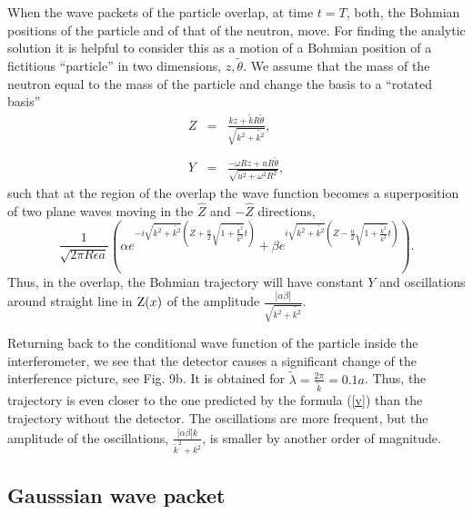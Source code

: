 \documentclass[12pt,preprint,tightenlines]{elsarticle}
\begin{document}
When the wave packets of the particle overlap, at time $t=T$, both,
the Bohmian positions of the particle and of that of the neutron, move. For
finding the analytic solution it is helpful to consider this as a
motion of a Bohmian position of a fictitious ``particle'' in two dimensions, $z,\tilde{\theta}$.
We assume that the mass of the neutron equal to the mass of the particle and change the basis to a ``rotated basis''
 \begin{eqnarray}
Z & = & \frac{kz+\tilde{k}R\tilde{\theta}}{\sqrt{k^{2}+\tilde{k^{2}}}},\nonumber \\
 & ~\\
Y & = & \frac{-\omega Rz+uR\tilde{\theta}}{\sqrt{u^{2}+\omega^{2}R^{2}}},\nonumber
\end{eqnarray}
 such that at the region of the overlap the wave function becomes
a superposition of two plane waves moving in the $\hat{Z}$ and $-\hat{Z}$
directions,
\begin{equation}
\frac{1}{\sqrt{2\pi R\epsilon a}}\left(\alpha e^{-i\sqrt{k^{2}+\tilde{k^{2}}}\left(Z+\frac{u}{2}\sqrt{1+\frac{\tilde{k^{2}}}{k^{2}}}t\right)}+
\beta e^{i\sqrt{k^{2}+\tilde{k^{2}}}\left(Z-\frac{u}{2}\sqrt{1+\frac{\tilde{k^{2}}}{k^{2}}}t\right )}\right).\label{Zofx}\end{equation}
 Thus, in the overlap, the Bohmian trajectory will have constant $Y$
and oscillations around straight line in ${\rm Z}(x)$ of the amplitude
$\frac{|\alpha\beta|}{\sqrt{k^{2}+\tilde{k^{2}}}}$.




Returning back to the conditional wave function of the particle inside the interferometer, we see that the detector causes a significant change of the interference picture, see Fig. 9b. It is obtained for $\tilde{\lambda}=\frac{2\pi}{\tilde{k}}=0.1a$.  Thus, the trajectory is even
closer to the one predicted by the formula (\ref{v}) than the trajectory without the detector. The oscillations
are more frequent, but the amplitude of the oscillations, $\frac{|\alpha\beta|k}{ \tilde{k}^{2}+ k^{2}}$, is  smaller by another order of magnitude.


\subsection{ Gausssian wave packet}
\end{document}
